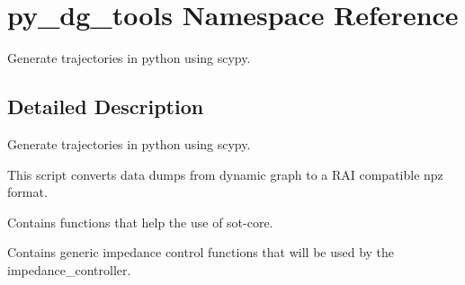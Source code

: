 \hypertarget{namespacepy__dg__tools}{}\section{py\+\_\+dg\+\_\+tools Namespace Reference}
\label{namespacepy__dg__tools}


Generate trajectories in python using scypy.  




\subsection{Detailed Description}
Generate trajectories in python using scypy. 

This script converts data dumps from dynamic graph to a R\+AI compatible npz format.

Contains functions that help the use of sot-\/core.

Contains generic impedance control functions that will be used by the impedance\+\_\+controller.

